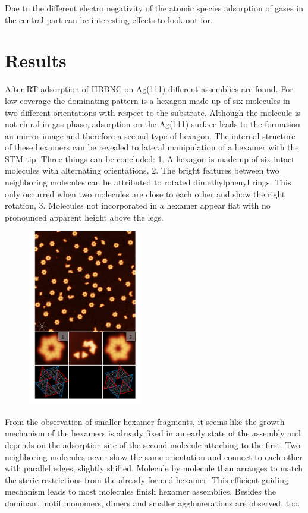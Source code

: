 Due to the different electro negativity of the atomic species adsorption of gases in the central part can be interesting effects to look out for.

\section{Results}
After RT adsorption of HBBNC on Ag(111) different assemblies are found. For low coverage the dominating pattern is a hexagon made up of six molecules in two different orientations with respect to the substrate. Although the molecule is not chiral in gas phase, adsorption on the Ag(111) surface leads to the formation an mirror image and therefore a second type of hexagon. The internal structure of these hexamers can be revealed to lateral manipulation of a hexamer with the STM tip. Three things can be concluded: 1. A hexagon is made up of six intact molecules with alternating orientations, 2. The bright features between two neighboring molecules can be attributed to rotated dimethylphenyl rings. This only occurred when two molecules are close to each other and show the right rotation, 3. Molecules not incorporated in a hexamer appear flat with no pronounced apparent height above the legs.

\begin{figure}\centering
	\includegraphics[width=5cm]{./images/hbbnc-ag-111-rt}
	\caption{}
	\label{}
\end{figure}

From the observation of smaller hexamer fragments, it seems like the growth mechanism of the hexamers is already fixed in an early state of the assembly and depends on the adsorption site of the second molecule attaching to the first. Two neighboring molecules never show the same orientation and connect to each other with parallel edges, slightly shifted.
Molecule by molecule than arranges to match the steric restrictions from the already formed hexamer. This efficient guiding mechanism leads to most molecules finish hexamer assemblies. 
Besides the dominant motif monomers, dimers and smaller agglomerations are observed, too.


